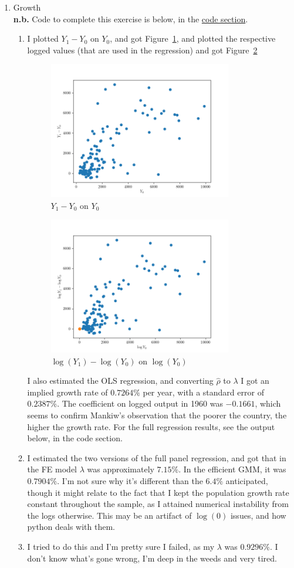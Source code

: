 \documentclass[10pt]{article}
\begin{document}
\begin{enumerate}
	\item Growth\\\textbf{n.b.} Code to complete this exercise is below, in the \href{code:p4}{code section}. \begin{enumerate} \item I plotted $Y_1 - Y_0$ on $Y_0$, and got Figure~\ref{fig:q41}, and plotted the respective logged values (that are used in the regression) and got Figure~\ref{fig:q41log} \begin{figure}[H] \centering \includegraphics[width=8cm]{ps4_code/ps4_q4_scatter.png} \caption{$Y_1 - Y_0$ on $Y_0$} \label{fig:q41}\end{figure}\begin{figure}[H] \centering \includegraphics[width=8cm]{ps4_code/ps4_q4_scatter_log.png} \caption{$\log(Y_1) - \log(Y_0)$ on $\log(Y_0)$} \label{fig:q41log}\end{figure}  I also estimated the OLS regression, and converting $\hat{\rho}$ to $\lambda$ I got an implied growth rate of $0.7264\%$ per year, with a standard error of $0.2387\%$. The coefficient on logged output in 1960 was $-0.1661$, which seems to confirm Mankiw's observation that the poorer the country, the higher the growth rate. For the full regression results, see the output below, in the code section. \item I estimated the two versions of the full panel regression, and got that in the FE model $\lambda$ was approximately $7.15\%$. In the efficient GMM, it was $0.7904\%$. I'm not sure why it's different than the $6.4\%$ anticipated, though it might relate to the fact that I kept the population growth rate constant throughout the sample, as I attained numerical instability from the logs otherwise. This may be an artifact of $\log(0)$ issues, and how python deals with them. \item I tried to do this and I'm pretty sure I failed, as my $\lambda$ was $0.9296\%$. I don't know what's gone wrong, I'm deep in the weeds and very tired. \end{enumerate}

\end{enumerate}
\end{document}
